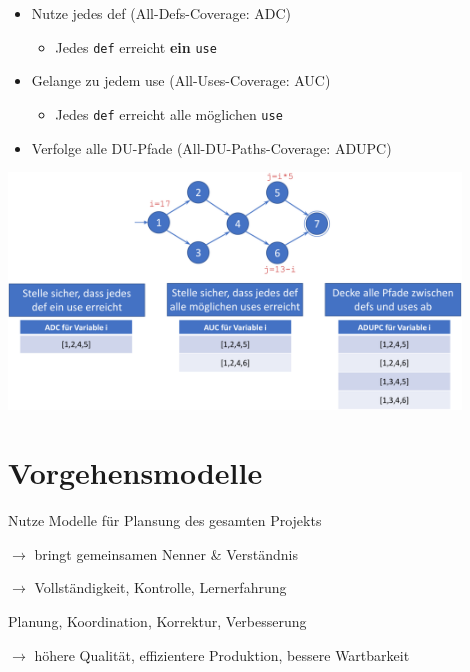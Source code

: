 \documentclass[11pt, a4paper]{article}
\begin{document}
\begin{itemize}
    \item Nutze jedes def (All-Defs-Coverage: ADC)
    \begin{itemize}
        \item Jedes \texttt{def} erreicht \textbf{ein} \texttt{use}
    \end{itemize}
    \item Gelange zu jedem use (All-Uses-Coverage: AUC)
    \begin{itemize}
        \item Jedes \texttt{def} erreicht alle möglichen \texttt{use}
    \end{itemize}
    \item Verfolge alle DU-Pfade (All-DU-Paths-Coverage: ADUPC)
\end{itemize}

\vspace{1em}

\centering \includegraphics[width=0.9\textwidth]{Graphen-15.png} 

\raggedright

\newpage


\section{Vorgehensmodelle}

Nutze Modelle für Plansung des gesamten Projekts

$\rightarrow$ bringt gemeinsamen Nenner \& Verständnis

$\rightarrow$ Vollständigkeit, Kontrolle, Lernerfahrung

\vspace{1em}

Planung, Koordination, Korrektur, Verbesserung

$\rightarrow$ höhere Qualität, effizientere Produktion, bessere Wartbarkeit
\end{document}
